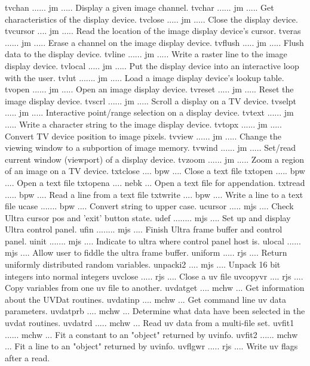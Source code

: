 {\eightpoint\begintt
tvchan ...... jm ..... Display a given image channel. 
tvchar ...... jm ..... Get characteristics of the display device. 
tvclose ..... jm ..... Close the display device. 
tvcursor .... jm ..... Read the location of the image display device's cursor. 
tveras ...... jm ..... Erase a channel on the image display device. 
\endtt}
{\eightpoint\begintt
tvflush ..... jm ..... Flush data to the display device. 
tvline ...... jm ..... Write a raster line to the image display device. 
tvlocal ..... jm ..... Put the display device into an interactive loop with the user. 
tvlut ....... jm ..... Load a image display device's lookup table. 
tvopen ...... jm ..... Open an image display device. 
\endtt}
{\eightpoint\begintt
tvreset ..... jm ..... Reset the image display device. 
tvscrl ...... jm ..... Scroll a display on a TV device. 
tvselpt ..... jm ..... Interactive point/range selection on a display device. 
tvtext ...... jm ..... Write a character string to the image display device. 
tvtopx ...... jm ..... Convert TV device position to image pixels. 
\endtt}
{\eightpoint\begintt
tvview ...... jm ..... Change the viewing window to a subportion of image memory.
tvwind ...... jm ..... Set/read current window (viewport) of a display device. 
tvzoom ...... jm ..... Zoom a region of an image on a TV device. 
txtclose .... bpw .... Close a text file 
txtopen ..... bpw .... Open a text file 
\endtt}
{\eightpoint\begintt
txtopena .... nebk ... Open a text file for appendation. 
txtread ..... bpw .... Read a line from a text file 
txtwrite .... bpw .... Write a line to a text file 
ucase ....... bpw .... Convert string to upper case. 
ucursor ..... mjs .... Check Ultra cursor pos and 'exit' button state. 
\endtt}
{\eightpoint\begintt
udef ........ mjs .... Set up and display Ultra control panel. 
ufin ........ mjs .... Finish Ultra frame buffer and control panel. 
uinit ....... mjs .... Indicate to ultra where control panel host is. 
ulocal ...... mjs .... Allow user to fiddle the ultra frame buffer. 
uniform ..... rjs .... Return uniformly distributed random variables. 
\endtt}
{\eightpoint\begintt
unpacki2 .... mjs .... Unpack 16 bit integers into normal integers 
uvclose ..... rjs .... Close a uv file 
uvcopyvr .... rjs .... Copy variables from one uv file to another. 
uvdatget .... mchw ... Get information about the UVDat routines. 
uvdatinp .... mchw ... Get command line uv data parameters. 
\endtt}
{\eightpoint\begintt
uvdatprb .... mchw ... Determine what data have been selected in the uvdat routines. 
uvdatrd ..... mchw ... Read uv data from a multi-file set. 
uvfit1 ...... mchw ... Fit a constant to an "object" returned by uvinfo. 
uvfit2 ...... mchw ... Fit a line to an "object" returned by uvinfo. 
uvflgwr ..... rjs .... Write uv flags after a read. 
\endtt}
